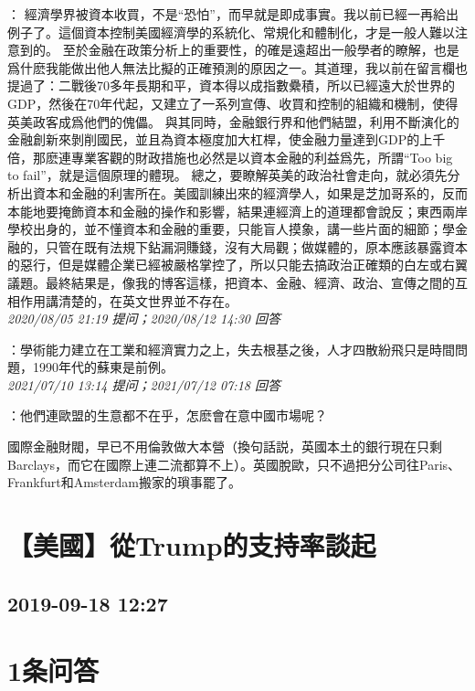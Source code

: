 \documentclass[twocolumn]{ctexart}
\begin{document}
：
經濟學界被資本收買，不是“恐怕”，而早就是即成事實。我以前已經一再給出例子了。這個資本控制美國經濟學的系統化、常規化和體制化，才是一般人難以注意到的。 
至於金融在政策分析上的重要性，的確是遠超出一般學者的瞭解，也是爲什麽我能做出他人無法比擬的正確預測的原因之一。其道理，我以前在留言欄也提過了：二戰後70多年長期和平，資本得以成指數纍積，所以已經遠大於世界的GDP，然後在70年代起，又建立了一系列宣傳、收買和控制的組織和機制，使得英美政客成爲他們的傀儡。 
與其同時，金融銀行界和他們結盟，利用不斷演化的金融創新來剝削國民，並且為資本極度加大杠桿，使金融力量達到GDP的上千倍，那麽連專業客觀的財政措施也必然是以資本金融的利益爲先，所謂“Too big to fail”，就是這個原理的體現。 
總之，要瞭解英美的政治社會走向，就必須先分析出資本和金融的利害所在。美國訓練出來的經濟學人，如果是芝加哥系的，反而本能地要掩飾資本和金融的操作和影響，結果連經濟上的道理都會說反；東西兩岸學校出身的，並不懂資本和金融的重要，只能盲人摸象，講一些片面的細節；學金融的，只管在既有法規下鉆漏洞賺錢，沒有大局觀；做媒體的，原本應該暴露資本的惡行，但是媒體企業已經被嚴格掌控了，所以只能去搞政治正確類的白左或右翼議題。最終結果是，像我的博客這樣，把資本、金融、經濟、政治、宣傳之間的互相作用講清楚的，在英文世界並不存在。
\\

\textit{\hfill\noindent\small 2020/08/05 21:19 提问；2020/08/12 14:30 回答}

：學術能力建立在工業和經濟實力之上，失去根基之後，人才四散紛飛只是時間問題，1990年代的蘇東是前例。
\\

\textit{\hfill\noindent\small 2021/07/10 13:14 提问；2021/07/12 07:18 回答}

：他們連歐盟的生意都不在乎，怎麽會在意中國市場呢？

國際金融財閥，早已不用倫敦做大本營（換句話説，英國本土的銀行現在只剩Barclays，而它在國際上連二流都算不上）。英國脫歐，只不過把分公司往Paris、Frankfurt和Amsterdam搬家的瑣事罷了。
\\


\section{【美國】從Trump的支持率談起}
\subsection{2019-09-18 12:27}


\section{1条问答}
\end{document}
